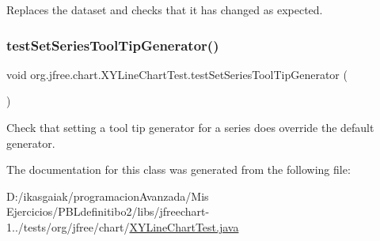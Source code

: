 Replaces the dataset and checks that it has changed as expected. \mbox{\label{classorg_1_1jfree_1_1chart_1_1_x_y_line_chart_test_ab8c9f1f3e611b7e4621b25c8281f0cfd}} 
\subsubsection{\texorpdfstring{test\+Set\+Series\+Tool\+Tip\+Generator()}{testSetSeriesToolTipGenerator()}}
{\footnotesize\ttfamily void org.\+jfree.\+chart.\+X\+Y\+Line\+Chart\+Test.\+test\+Set\+Series\+Tool\+Tip\+Generator (\begin{DoxyParamCaption}{ }\end{DoxyParamCaption})}

Check that setting a tool tip generator for a series does override the default generator. 

The documentation for this class was generated from the following file\+:\begin{DoxyCompactItemize}
\item 
D\+:/ikasgaiak/programacion\+Avanzada/\+Mis Ejercicios/\+P\+B\+Ldefinitibo2/libs/jfreechart-\/1../tests/org/jfree/chart/\mbox{\hyperlink{_x_y_line_chart_test_8java}{X\+Y\+Line\+Chart\+Test.\+java}}\end{DoxyCompactItemize}
